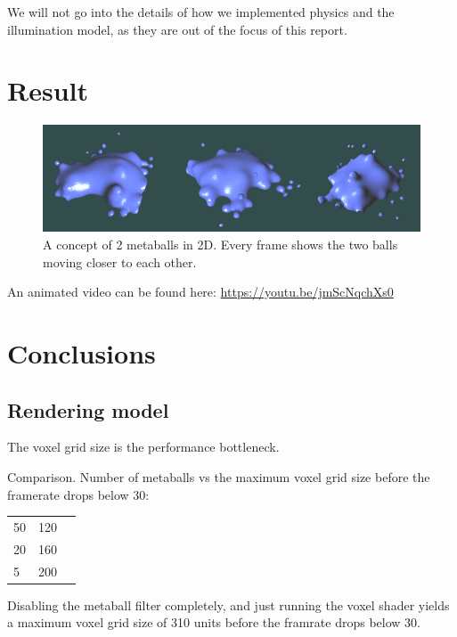 \documentclass{article}
\begin{document}
\begin{multicols}{2}
            We will not go into the details of how we implemented physics and the illumination model, as they are out of the focus of this report.

    \section{Result}
        \begin{figure}[H]
        	\begin{minipage}[b]{0.5\textwidth}
	            \includegraphics[width=\linewidth]{img/result-animation.png}
				\caption{A concept of 2 metaballs in 2D. Every frame shows the two balls moving closer to each other.}
				\label{fig:result-animation}
        	\end{minipage}
        \end{figure}
        An animated video can be found here:
        \url{https://youtu.be/jmScNqchXs0}
    \section{Conclusions}
    
        \subsection{Rendering model}
        The voxel grid size is the performance bottleneck.

        Comparison.
        Number of metaballs vs the maximum voxel grid size before the framerate drops below 30:

        \begin{tabular}{ l | c | r }
          50 & 120 \\
          20 & 160 \\
          5 & 200 \\
        \end{tabular}

        Disabling the metaball filter completely, and just running the voxel shader yields a maximum voxel grid size of 310 units before the framrate drops below 30.


\end{multicols}
\end{document}
